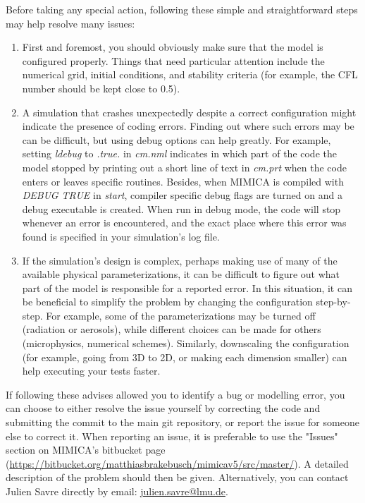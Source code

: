 \documentclass[12pt,A4,french]{article}
\begin{document}
Before taking any special action, following these simple and straightforward steps may help resolve many issues:
\begin{enumerate}
    \item First and foremost, you should obviously make sure that the model is configured properly. Things that need particular attention include the numerical grid, initial conditions, and stability criteria (for example, the CFL number should be kept close to 0.5).
    \item A simulation that crashes unexpectedly despite a correct configuration might indicate the presence of coding errors. Finding out where such errors may be can be difficult, but using debug options can help greatly. For example, setting {\it ldebug} to {\it .true.} in {\it cm.nml} indicates in which part of the code the model stopped by printing out a short line of text in {\it cm.prt} when the code enters or leaves specific routines. Besides, when MIMICA is compiled with {\it DEBUG TRUE} in {\it start}, compiler specific debug flags are turned on and a debug executable is created. When run in debug mode, the code will stop whenever an error is encountered, and the exact place where this error was found is specified in your simulation's log file.
    \item If the simulation's design is complex, perhaps making use of many of the available physical parameterizations, it can be difficult to figure out what part of the model is responsible for a reported error. In this situation, it can be beneficial to simplify the problem by changing the configuration step-by-step. For example, some of the parameterizations may be turned off (radiation or aerosols), while different choices can be made for others (microphysics, numerical schemes). Similarly, downscaling the configuration (for example, going from 3D to 2D, or making each dimension smaller) can help executing your tests faster.
\end{enumerate}

If following these advises allowed you to identify a bug or modelling error, you can choose to either resolve the issue yourself by correcting the code and submitting the commit to the main git repository, or report the issue for someone else to correct it. When reporting an issue, it is preferable to use the "Issues" section on MIMICA's bitbucket page (\url{https://bitbucket.org/matthiasbrakebusch/mimicav5/src/master/}). A detailed description of the problem should then be given. Alternatively, you can contact Julien Savre directly by email: \href{mailto:julien.savre@lmu.de}{julien.savre@lmu.de}.
        
\end{document}
